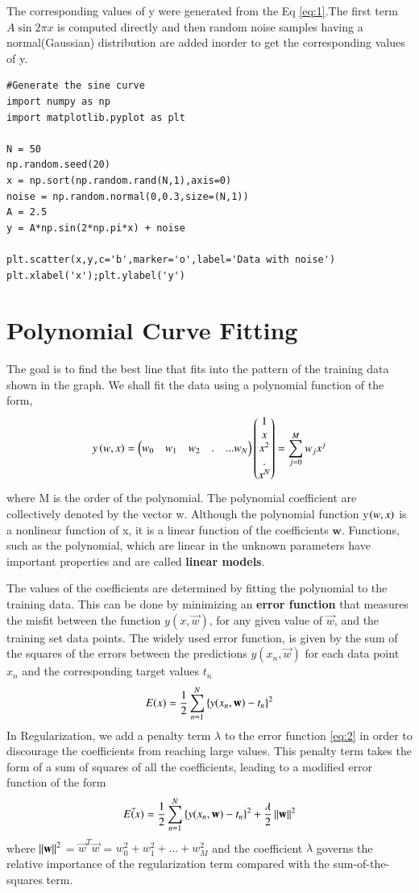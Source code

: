 \documentclass[journal,12pt,twocolumn]{IEEEtran}
\begin{document}
The corresponding values of y were generated from the Eq \eqref{eq:1}.The first term $A\sin{2\pi x}$ is computed directly and then random noise samples having a normal(Gaussian) distribution are added inorder to get the corresponding values of y.
\begin{lstlisting}
#Generate the sine curve 
import numpy as np
import matplotlib.pyplot as plt

N = 50
np.random.seed(20)
x = np.sort(np.random.rand(N,1),axis=0)
noise = np.random.normal(0,0.3,size=(N,1))
A = 2.5
y = A*np.sin(2*np.pi*x) + noise

plt.scatter(x,y,c='b',marker='o',label='Data with noise')
plt.xlabel('x');plt.ylabel('y')
\end{lstlisting}
%
\section{Polynomial Curve Fitting}
The goal is to find the best line that fits into the  pattern of the training data shown in the graph.
We shall fit the data using a polynomial function of the form, 
\begin{align}
     y\left(w,x\right)= \begin{pmatrix}w_0 & w_1 & w_2 &.&...w_N\end{pmatrix}\begin{pmatrix}1 \\x\\x^2\\.\\x^N\end{pmatrix}= \sum_{j=0}^{M} w_j x^{j}
\end{align}
where M is the order of the polynomial.
The polynomial coefficient are collectively denoted by the vector w.
Although the polynomial function y$\left(w,x\right)$ is a nonlinear function of x, it
is a linear function of the coefficients $\textbf{w}$. Functions, such as the polynomial, which are linear in the unknown parameters have important properties and are called \textbf{linear models}.

The values of the coefficients are determined by fitting the polynomial to the
training data. This can be done by minimizing an \textbf{error function} that measures the
misfit between the function $y(x,\vec{w})$, for any given value of $\vec{w}$, and the training set data points. The widely used error function, is given by
the sum of the squares of the errors between the predictions $y(x_{n},\vec{w})$ for each data point $x_{n}$ and the corresponding target values $t_{n}$
\begin{align}
    E(x) = \frac{1}{2}\sum_{n=1}^{N}\left\{y(x_{n},\mathbf{w}) - t_{n}\right\}^2 \label{eq:2}
\end{align}
In Regularization, we add a penalty term $\lambda$ to the error function \eqref{eq:2} in order to discourage the coefficients from reaching large values. This penalty term takes the form of a sum of squares of all the coefficients, leading to a modified error function of the form
\begin{align}
    \Tilde{E(x)} = \frac{1}{2}\sum_{n=1}^{N}\left\{y(x_{n},\mathbf{w}) - t_{n}\right\}^2 + \frac{\lambda}{2}\left\lVert\mathbf{w}\right\rVert^2
\end{align}
where $\left\lVert\mathbf{w}\right\rVert^2$ = $\vec{w}^T\vec{w}$ = $w_{0}^2 + w_{1}^2 + ... +w_{M}^2$ and the coefficient $\lambda$ governs the relative importance of the regularization term compared with the sum-of-the-squares term.
\end{document}
